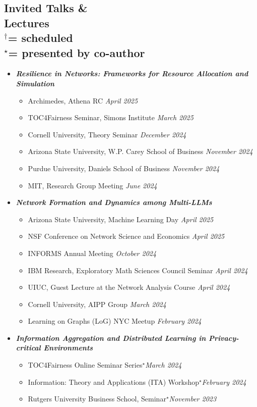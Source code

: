 \documentclass[margin]{res}
\newcommand{\scheduled}[0]{\ensuremath {^\dagger}}
\newcommand{\presentedbycoauthor}[0]{\ensuremath {^{\star}}}
\newcommand{\bemph}[1]{\textbf{\emph{#1}}}
\begin{document}
\begin{resume}
\section{Invited Talks \& \\ Lectures \\
\footnotesize
\scheduled  = \textup{scheduled} \\ \presentedbycoauthor = \textup{presented by co-author}
}

\begin{itemize}[nosep]
	\item \bemph{Resilience in Networks: Frameworks for Resource Allocation and Simulation}
	\begin{itemize}[nosep]
		\item Archimedes, Athena RC \hfill \emph{April 2025}
		\item TOC4Fairness Seminar, Simons Institute \hfill \emph{March 2025}
		\item Cornell University, Theory Seminar \hfill \emph{December 2024}
		\item Arizona State University, W.P. Carey School of Business \hfill \emph{November 2024}
		\item Purdue University, Daniels School of Business \hfill \emph{November 2024}
		\item MIT, Research Group Meeting \hfill \emph{June 2024}
	\end{itemize}

	\item \bemph{Network Formation and Dynamics among Multi-LLMs}
	\begin{itemize}[nosep]
		\item Arizona State University, Machine Learning Day \hfill \emph{April 2025}
		\item NSF Conference on Network Science and Economics \hfill \emph{April 2025}
		\item INFORMS Annual Meeting \hfill \emph{October 2024}
		\item IBM Research, Exploratory Math Sciences Council Seminar  \hfill \emph{April 2024} 
		\item UIUC, Guest Lecture at the Network Analysis Course \hfill \emph{April 2024}
		\item Cornell University, AIPP Group \hfill \emph{March 2024}
		\item Learning on Graphs (LoG) NYC Meetup \hfill \emph{February 2024}
	\end{itemize}
	
	\item \bemph{Information Aggregation and Distributed Learning in Privacy-critical Environments}
	\begin{itemize}[nosep]
	\item  TOC4Fairness Online Seminar Series\presentedbycoauthor \hfill \emph{March 2024}
	\item Information: Theory and Applications (ITA) Workshop\presentedbycoauthor \hfill \emph{February 2024}
	\item Rutgers University Business School, Seminar\presentedbycoauthor \hfill \emph{November 2023}	
	\end{itemize}


\end{itemize}
\end{resume}
\end{document}
